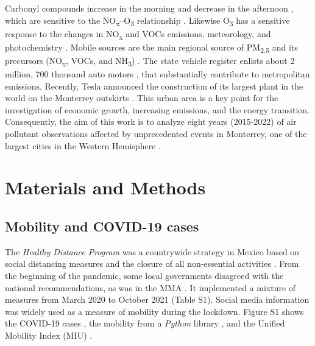 \documentclass[preprint,12pt]{elsarticle}
\begin{document}
Carbonyl compounds increase in the morning and decrease in the afternoon \citep{j2012}, which are sensitive to the NO\textsubscript{x}--O\textsubscript{3} relationship \citep{Menchaca_Torre_2015a}. Likewise O\textsubscript{3} has a sensitive response to the changes in NO\textsubscript{x} and VOCs emissions, meteorology, and photochemistry \citep{Hern_ndez_Paniagua_2017}. Mobile sources are the main regional source of PM\textsubscript{2.5} and its precursors (NO\textsubscript{x}, VOCs, and NH\textsubscript{3}) \citep{Martinez-Cinco2016}. The state vehicle register enlists about 2 million, 700 thousand auto motors \citep{len}, that substantially contribute to metropolitan emissions. Recently, Tesla announced the construction of its largest plant in the world on the Monterrey outskirts \citep{tesla_2023}. This urban area is a key point for the investigation of economic growth, increasing emissions, and the energy transition. Consequently, the aim of this work is to analyze eight years (2015-2022) of air pollutant observations affected by unprecedented events in Monterrey, one of the largest cities in the Western Hemisphere \citep{Ni_2023}.
\section{Materials and Methods}
\subsection{Mobility and COVID-19 cases}
The \emph{Healthy Distance Program} was a countrywide strategy in Mexico based on social distancing measures and the closure of all non-essential activities \citep{covid-19a}. From the beginning of the pandemic, some local governments disagreed with the national recommendations, as was in the MMA \citep{state}. It implemented a mixture of measures from March 2020 to October 2021 (Table S1). Social media information was widely used as a measure of mobility during the lockdown. Figure S1 shows the COVID-19 cases \citep{covid19mex}, the mobility from a \emph{Python} library \citep{Graff_2022}, and the Unified Mobility Index (MIU) \citep{conacyt}.
\end{document}
